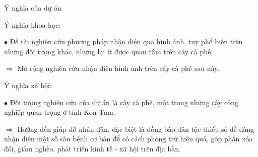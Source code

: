 \documentclass{beamer}
\begin{document}
\begin{frame}[allowframebreaks]{Ý nghĩa của dự án}
	
	Ý nghĩa khoa học:

	\null

	$\bullet$ Đề tài nghiên cứu phương pháp nhận diện qua hình ảnh, tuy phổ biến trên những đối tượng khác, nhưng lại ít được quan tâm trên cây cà phê.
	
	\null

	$\Rightarrow$ Mở rộng nghiên cứu nhận diện hình ảnh trên cây cà phê sau này.

	\framebreak

	Ý nghĩa xã hội:

	\null

	$\bullet$ Đối tượng nghiên cứu của dự án là cây cà phê, một trong những cây công nghiệp quan trọng ở tỉnh Kon Tum.

	\null

	$\Rightarrow$ Hướng đến giúp đỡ nhân dân, đặc biệt là đồng bào dân tộc thiểu số dễ dàng nhận diện một số sâu bệnh cơ bản để có cách phòng trừ hiệu quả, góp phần xóa đói, giảm nghèo, phát triển kinh tế - xã hội trên địa bàn.

\end{frame}
\end{document}
